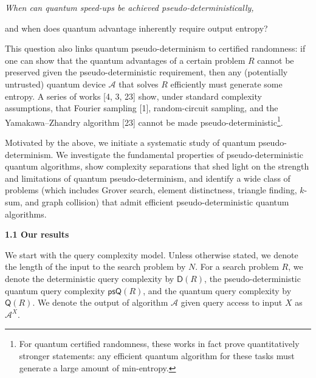 {\itshape When can quantum speed-ups be achieved pseudo-deterministically,

and when does quantum advantage inherently require output entropy?}\par





This question also links quantum pseudo-determinism to certified randomness: if one can show that the quantum advantages of a certain problem ${R}$ cannot be preserved given the pseudo-deterministic requirement, then any (potentially untrusted) quantum device $\mathcal{A}$ that solves ${R}$ efficiently must generate some entropy.
A series of works [4, 3, 23] show, under standard complexity assumptions, that Fourier sampling [1], random-circuit sampling, and the Yamakawa–Zhandry algorithm [23] cannot be made pseudo-deterministic\footnote{For quantum certified randomness, these works in fact prove quantitatively stronger statements: any efficient quantum algorithm for these tasks must generate a large amount of min-entropy.}.\par




Motivated by the above, we initiate a systematic study of quantum pseudo-determinism. We investigate the fundamental properties of pseudo-deterministic quantum algorithms, show complexity separations that shed light on the strength and limitations of quantum pseudo-determinism, and identify a wide class of problems (which includes Grover search, element distinctness, triangle finding, $k$-sum, and graph collision) that admit efficient pseudo-deterministic quantum algorithms.\par




\par\medskip\noindent\textbf{
1.1 Our results}\par




We start with the query complexity model. Unless otherwise stated, we denote the length of the input to the search problem by $N$. For a search problem ${R}$, we denote the deterministic query complexity by $\mathsf{D}({R})$, the pseudo-deterministic quantum query complexity $\mathsf{psQ}({R})$, and the quantum query complexity by $\mathsf{Q}({R})$. We denote the output of algorithm $\mathcal{A}$ given query access to input $X$ as $\mathcal{A}^{X}$.\par




